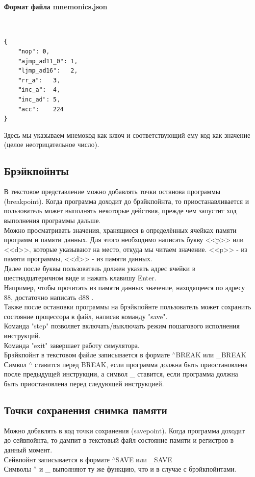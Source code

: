 \paragraph{Формат файла mnemonics.json}~\\
\begin{lstlisting}
{
	"nop": 0,	
	"ajmp_ad11_0": 1,
	"ljmp_ad16":   2,
	"rr_a":   3,
	"inc_a":  4,
	"inc_ad": 5,
	"acc":    224
}
\end{lstlisting}
Здесь мы указываем мнемокод как ключ и соответствующий ему код как значение (целое неотрицательное число). 

\newpage
\subsection{Брэйкпойнты}
В текстовое представление можно добавлять точки останова программы (breakpoint). Когда программа доходит до брэйкпойнта, то приостанавливается и пользователь может выполнять некоторые действия, прежде чем запустит ход выполнения программы дальше.\\
Можно просматривать значения, хранящиеся в определённых ячейках памяти программ и памяти данных. Для этого необходимо написать букву <<p>> или <<d>>, которые указывают на место, откуда мы читаем значение. <<p>> - из памяти программы, <<d>> - из памяти данных. \\
Далее после буквы пользователь должен указать адрес ячейки в шестнадцатеричном виде и нажать клавишу Enter. \\
Например, чтобы прочитать из памяти данных значение, находящееся по адресу 88, достаточно написать d88 . \\
Также после остановки программы на брэйкпойнте пользователь может сохранить состояние процессора в файл, написав команду "save". \\
Команда "step" позволяет включать/выключать режим пошагового исполнения инструкций. \\
Команда "exit" завершает работу симулятора. \\
Брэйкпойнт в текстовом файле записывается в формате $^\wedge$BREAK или \_BREAK \\
Символ $^\wedge$ ставится перед BREAK, если программа должна быть приостановлена после предыдущей инструкции, а символ \_ ставится, если программа должна быть приостановлена перед следующей инструкцией.

\subsection{Точки сохранения снимка памяти}
Можно добавлять в код точки сохранения (savepoint). Когда программа доходит до сейвпойнта, то дампит в текстовый файл состояние памяти и регистров в данный момент.\\
Сейвпойнт записывается в формате $^\wedge$SAVE или \_SAVE \\
Символы $^\wedge$ и \_ выполняют ту же функцию, что и в случае с брэйкпойнтами. \\

